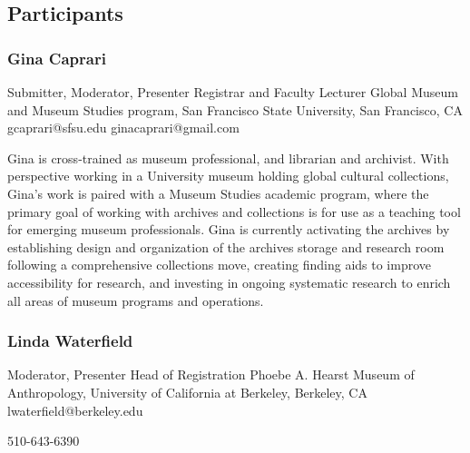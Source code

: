 \documentclass{report}
\begin{document}
            \subsection*{Participants}
              \subsubsection*{ Gina Caprari }
              Submitter, Moderator, Presenter\newline
              Registrar and Faculty Lecturer\newline
              Global Museum and Museum Studies program, San Francisco State University, San Francisco, CA
              \newline
              gcaprari@sfsu.edu\newline
              ginacaprari@gmail.com\newline
              

              Gina is cross-trained as museum professional, and librarian and archivist. With perspective working in a University museum holding global cultural collections, Gina’s work is paired with a Museum Studies academic program, where the primary goal of working with archives and collections is for use as a teaching tool for emerging museum professionals. Gina is currently activating the archives by establishing design and organization of the archives storage and research room following a comprehensive collections move, creating finding aids to improve accessibility for research, and investing in ongoing systematic research to enrich all areas of museum programs and operations.\newline


              
                \subsubsection*{ Linda Waterfield }
                Moderator, Presenter\newline
                Head of Registration\newline
                Phoebe A. Hearst Museum of Anthropology, University of California at Berkeley, Berkeley, CA
                \newline
                lwaterfield@berkeley.edu\newline
                
                510-643-6390\newline
\end{document}
